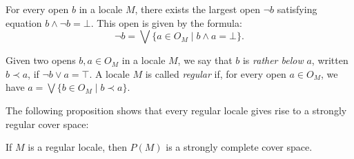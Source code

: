 \documentclass[reqno]{amsart}
\theoremstyle{definition}
\theoremstyle{remark}
\numberwithin{figure}{section}
\newcommand{\rb}{\prec}
\begin{document}
For every open $b$ in a locale $M$, there exists the largest open $\neg b$ satisfying equation $b \wedge \neg b = \bot$.  
This open is given by the formula:
\[ \neg b = \bigvee \{ a \in O_M \mid b \wedge a = \bot \}. \]

\begin{defn}
Given two opens $b,a \in O_M$ in a locale $M$, we say that $b$ is \emph{rather below} $a$, written $b \rb a$, if $\neg b \vee a = \top$.  
A locale $M$ is called \emph{regular} if, for every open $a \in O_M$, we have $a = \bigvee \{ b \in O_M \mid b \rb a \}$.
\end{defn}

The following proposition shows that every regular locale gives rise to a strongly regular cover space:

\begin{prop}
If $M$ is a regular locale, then $P(M)$ is a strongly complete cover space.
\end{prop}
\end{document}

